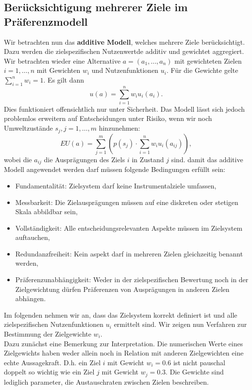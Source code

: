 \subsection{Berücksichtigung mehrerer Ziele im Präferenzmodell}
Wir betrachten nun das \textbf{additive Modell}, welches mehrere Ziele berücksichtigt. Dazu werden die zielspezifischen Nutzenwertde additiv und gewichtet aggregiert.\\
Wir betrachten wieder eine Alternative \(a = (a_1, \ldots, a_n)\) mit gewichteten Zielen \(i=1,\ldots,n\) mit Gewichten \(w_i\) und Nutzenfunktionen \(u_i\). Für die Gewichte gelte \(\sum_{i=1}^n w_i = 1\). Es gilt dann
\[
	u(a) = \sum_{i=1}^n w_iu_i(a_i).
\]
Dies funktioniert offensichtlich nur unter Sicherheit. Das Modell lässt sich jedoch problemlos erweitern auf Entscheidungen unter Risiko, wenn wir noch Umweltzustände \(s_j, j=1,\ldots,m\) hinzunehmen:
\[
	EU(a) = \sum_{j=1}^m \left( p(s_j) \cdot \sum_{i=1}^n w_iu_i(a_{ij})\right),
\]
wobei die \(a_{ij}\) die Ausprägungen des Ziels \(i\) in Zustand \(j\) sind. damit das additive Modell angewendet werden darf müssen folgende Bedingungen erfüllt sein:
\begin{itemize}
	\item Fundamentalität: Zielsystem darf keine Instrumentalziele umfassen,
	\item Messbarkeit: Die Zielausprägungen müssen auf eine diskreten oder stetigen Skala abbildbar sein,
	\item Vollständigkeit: Alle entscheidungsrelevanten Aspekte müssen im Zielsystem auftauchen,
	\item Redundanzfreiheit: Kein aspekt darf in mehreren Zielen gleichzeitig benannt werden,
	\item Präferenzunabhängigkeit: Weder in der zielspezifischen Bewertung noch in der Zielgewichtung dürfen Präferenzen von Ausprägungen in anderen Zielen abhängen.
\end{itemize}
Im folgenden nehmen wir an, dass das Zielsystem korrekt definiert ist und alle zielspezifischen Nutzenfunktionen \(u_i\) ermittelt sind. Wir zeigen nun Verfahren zur Bestimmung der Zielgewichte \(w_i\).\\
Dazu zunächst eine Bemerkung zur Interpretation. Die numerischen Werte eines Zielgewichts haben weder allein noch in Relation mit anderen Zielgewichten eine echte Aussagekraft. D.h. ein Ziel \(i\) mit Gewicht \(w_i=0.6\) ist nicht pauschal doppelt so wichtig wie ein Ziel \(j\) mit Gewicht \(w_j=0.3\). Die Gewichte sind lediglich parameter, die Austauschraten zwischen Zielen beschreiben.\\

